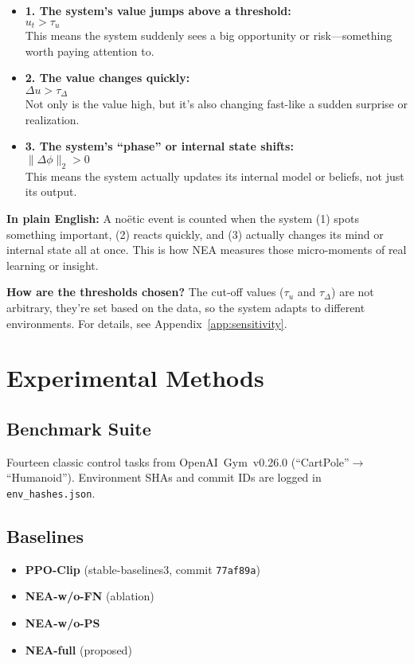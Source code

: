 \documentclass[11pt]{article}
\begin{document}
\begin{itemize}
  \item \textbf{1. The system’s value jumps above a threshold:} \\
    $u_t > \tau_u$ \\
    This means the system suddenly sees a big opportunity or risk—something worth paying attention to.
  \item \textbf{2. The value changes quickly:} \\
    $\Delta u > \tau_{\Delta}$ \\
    Not only is the value high, but it’s also changing fast-like a sudden surprise or realization.
  \item \textbf{3. The system’s “phase” or internal state shifts:} \\
    $\|\Delta\phi\|_2 > 0$ \\
    This means the system actually updates its internal model or beliefs, not just its output.
\end{itemize}

\textbf{In plain English:}  
A noëtic event is counted when the system (1) spots something important, (2) reacts quickly, and (3) actually changes its mind or internal state all at once. This is how NEA measures those micro-moments of real learning or insight.

\textbf{How are the thresholds chosen?}  
The cut-off values ($\tau_u$ and $\tau_{\Delta}$) are not arbitrary, they’re set based on the data, so the system adapts to different environments. For details, see Appendix~\ref{app:sensitivity}.

\section{Experimental Methods}
\label{sec:methods}

\subsection{Benchmark Suite}
Fourteen classic control tasks from OpenAI~Gym~v0.26.0
(``CartPole''$\to$``Humanoid'').  Environment SHAs and commit IDs are logged in
\texttt{env\_hashes.json}.

\subsection{Baselines}
\begin{itemize}[itemsep=2pt]
  \item \textbf{PPO-Clip} (stable-baselines3, commit
        \texttt{77af89a})  
  \item \textbf{NEA-w/o-FN} (ablation)  
  \item \textbf{NEA-w/o-PS}  
  \item \textbf{NEA-full} (proposed)  
\end{itemize}
\end{document}
